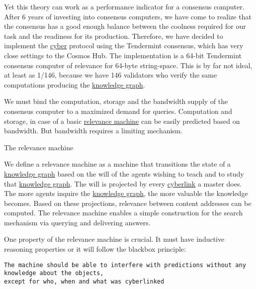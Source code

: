 \documentclass[8pt,oneside]{amsart}
\makeatletter
\newcommand{\linkred}[2]{\href{#1}{\color{red}{#2}}}
\newcommand{\linkgreen}[2]{\href{#1}{\color{green}{#2}}}
\renewcommand\subsection{\@startsection{subsection}
                                    {2}{\z@}
                                    {-3.25ex\@plus -1ex \@minus -.2ex}
                                    {0ex \@plus .2ex}
                                    {\play\Large}
                        }
\newcommand{\titleSection}[1]{\subsection{#1}}
\makeatother
\begin{document}
Yet this theory can work as a performance indicator for a consensus computer. After 6 years of investing into consensus computers, we have come to realize that the \linkgreen{https://ipfs.io/ipfs/QmaMtD7xDgghqgjN62zWZ5TBGFiEjGQtuZBjJ9sMh816KJ}{Tendermint} consensus has a good enough balance between the coolness required for our task and the readiness for its production. Therefore, we have decided to implement the {\hyperref[cyber]{cyber}} protocol using the Tendermint consensus, which has very close settings to the Cosmos Hub. The \linkred{https://github.com/cybercongress/go-cyber}{go-cyber} implementation is a 64-bit Tendermint consensus computer of relevance for 64-byte string-space. This is by far not ideal, at least as 1/146, because we have 146 validators who verify the same computations producing the {\hyperref[knowledge-graph]{knowledge graph}}.

We must bind the computation, storage and the bandwidth supply of the consensus computer to a maximized demand for queries. Computation and storage, in case of a basic {\hyperref[relevance-machine]{relevance machine}} can be easily predicted based on bandwidth. But bandwidth requires a limiting mechanism.

\titleSection{The relevance machine}\label{relevance-machine}

We define a relevance machine as a machine that transitions the state of a {\hyperref[knowledge-graph]{knowledge graph}} based on the will of the agents wishing to teach and to study that {\hyperref[knowledge-graph]{knowledge graph}}. The will is projected by every {\hyperref[cyberlinks]{cyberlink}} a master does. The more agents inquire the {\hyperref[knowledge-graph]{knowledge graph}}, the more valuable the knowledge becomes. Based on these projections, relevance between content addresses can be computed. The relevance machine enables a simple construction for the search mechanism via querying and delivering answers.

One property of the relevance machine is crucial. It must have inductive reasoning properties or it will follow the blackbox principle:

\begin{lstlisting}
The machine should be able to interfere with predictions without any knowledge about the objects,
except for who, when and what was cyberlinked
\end{lstlisting}
\end{document}

